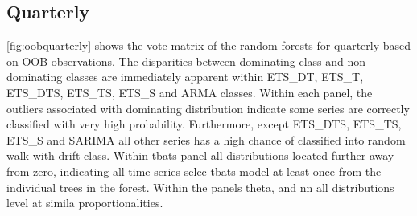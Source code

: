 \documentclass[11pt,a4paper,]{article}
\begin{document}
\subsection{Quarterly}\label{quarterly}

\autoref{fig:oobquarterly} shows the vote-matrix of the random forests
for quarterly based on OOB observations. The disparities between
dominating class and non-dominating classes are immediately apparent
within ETS\_DT, ETS\_T, ETS\_DTS, ETS\_TS, ETS\_S and ARMA classes.
Within each panel, the outliers associated with dominating distribution
indicate some series are correctly classified with very high
probability. Furthermore, except ETS\_DTS, ETS\_TS, ETS\_S and SARIMA
all other series has a high chance of classified into random walk with
drift class. Within tbats panel all distributions located further away
from zero, indicating all time series selec tbats model at least once
from the individual trees in the forest. Within the panels theta, and nn
all distributions level at simila proportionalities.
\end{document}
